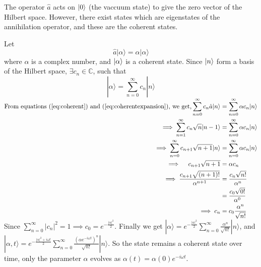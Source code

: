 \documentclass[12pt, twoside]{article}
\begin{document}
The operator $\hat{a}$ acts on $\ket{0}$ (the vaccuum state) to give the zero vector of the Hilbert space. However, there exist states which are eigenstates of the annihilation operator, and these are the coherent states.

Let \begin{equation}\label{eq:coherent}
	\hat {a} | \alpha \rangle = \alpha | \alpha \rangle
\end{equation} where $\alpha$ is a complex number, and $\ket{\alpha}$ is a coherent state. Since $\ket{n}$ form a basis of the Hilbert space, $\exists c_n \in \mathbb{C}$, such that \begin{equation} \label{eq:coherentexpansion}| \alpha \rangle = \displaystyle\sum _ { n = 0 } ^ { \infty } c_n | n \rangle \end{equation}
$\begin{aligned}\text{From equations (\ref{eq:coherent}) and (\ref{eq:coherentexpansion}), we get,}\displaystyle\sum _ { n = 0 } ^ { \infty } c_ { n } \hat {a} | n \rangle &= \sum _ { n = 0 } ^ { \infty } \alpha c_{ n } | n \rangle\\\implies \sum _ { n = 1 } ^ { \infty } c_{ n } \sqrt { n } | n - 1 \rangle &= \sum _ { n = 0 } ^ { \infty } \alpha c_{ n } | n \rangle \\ \implies \sum _ { n = 0 } ^ { \infty } c _ { n + 1 } \sqrt { n + 1 } | n \rangle &= \sum _ { n = 0 } ^ { \infty } \alpha c _ { n } | n \rangle\\ \implies \quad c _ { n + 1 } \sqrt { n + 1 } &= \alpha c _ { n } \\  \implies \frac { c _ { n + 1 } \sqrt { ( n + 1 ) ! } } { \alpha ^ { n + 1 } }  &= \frac { c _ { n } \sqrt { n ! } } { \alpha ^ { n } } \\  &= \frac { c _ { 0 } \sqrt { 0 ! } } { \alpha ^ { 0 } }  \\ \implies c _ { n } &= c _ { 0 } \frac { \alpha ^ { n } } { \sqrt { n ! } }\end{aligned}$\\
Since $\displaystyle\sum _ { n = 0 } ^ { \infty } \left| c _ { n } \right| ^ { 2 } = 1 \implies c _ { 0 } = e ^ { - \frac { | \alpha | ^ { 2 } } { 2 } }$. Finally we get $\displaystyle| \alpha \rangle = e ^ { - \frac {|\alpha| ^ { 2 } } { 2 } } \sum _ { n = 0 } ^ { \infty } \frac { \alpha ^ { n } } { \sqrt { n ! } } | n \rangle$,
and $\displaystyle| \alpha,t \rangle = e ^ { - \frac {|\alpha| ^ { 2 } + i\omega t} { 2 }} \sum _ { n = 0 } ^ { \infty } \frac { (\alpha e^{-i\omega t})^ { n }  } { \sqrt { n ! } } | n \rangle$. So the state remains a coherent state over time, only the parameter $\alpha$ evolves as $\alpha(t) = \alpha(0) e^{-i\omega t}$.
\end{document}
